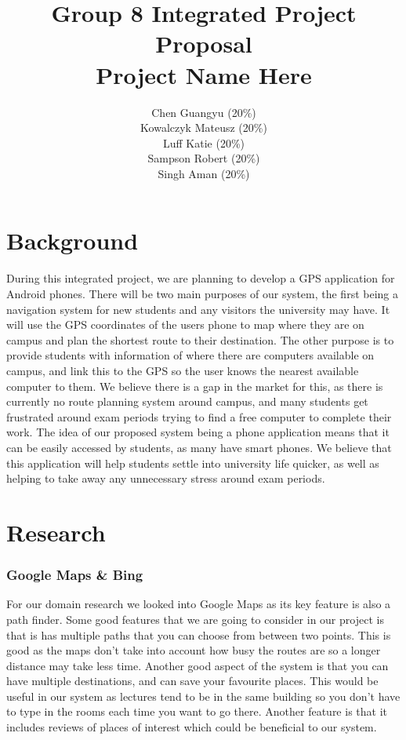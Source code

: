 \documentclass[10pt,a4paper,oneside]{report}
\begin{document}
\title{Group 8 Integrated Project Proposal\\Project Name Here}

\author{
  Chen Guangyu (20\%)\\
  Kowalczyk Mateusz (20\%)\\
  Luff Katie (20\%)\\
  Sampson Robert (20\%)\\
  Singh Aman (20\%)\\ }
\maketitle
\section*{Background}
During this integrated project, we are planning to develop a GPS application for Android phones. There will be two main purposes of our system, the first being a navigation system for new students and any visitors the university may have. It will use the GPS coordinates of the users phone to map where they are on campus and plan the shortest route to their destination. The other purpose is to provide students with information of where there are computers available on campus, and link this to the GPS so the user knows the nearest available computer to them.
We believe there is a gap in the market for this, as there is currently no route planning system around campus, and many students get frustrated around exam periods trying to find a free computer to complete their work. The idea of our proposed system being a phone application means that it can be easily accessed by students, as many have smart phones. We believe that this application will help students settle into university life quicker, as well as helping to take away any unnecessary stress around exam periods.

\section*{Research}

\subsubsection*{Google Maps \& Bing}
For our domain research we looked into Google Maps as its key feature is also a path finder. Some good features that we are going to consider in our project is that is has multiple paths that you can choose from between two points. This is good as the maps don't take into account how busy the routes are so a longer distance may take less time. Another good aspect of the system is that you can have multiple destinations, and can save your favourite places. This would be useful in our system as lectures tend to be in the same building so you don't have to type in the rooms each time you want to go there. Another feature is that it includes reviews of places of interest which could be beneficial to our system.
\end{document}
